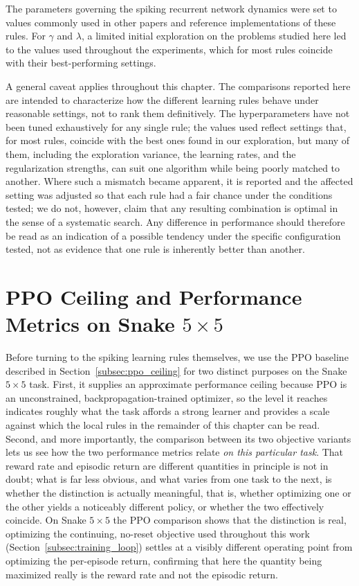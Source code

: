 The parameters governing the spiking recurrent network dynamics were set to values commonly used
in other papers and reference implementations of these rules. For
$\gamma$ and $\lambda$, a limited initial exploration on the problems studied here led to the
values used throughout the experiments, which for most rules coincide with their best-performing
settings.

A general caveat applies throughout this chapter. The comparisons reported here are
intended to characterize how the different learning rules behave under reasonable settings, not
to rank them definitively. The hyperparameters have not been tuned exhaustively for any single
rule; the values used reflect settings that, for most rules, coincide with the best ones found in
our exploration, but many of them, including the exploration variance, the learning rates, and the
regularization strengths, can suit one algorithm while being poorly matched to another. Where such
a mismatch became apparent, it is reported and the affected setting was adjusted so that each rule
had a fair chance under the conditions tested; we do not, however, claim that any resulting
combination is optimal in the sense of a systematic search. Any difference in performance should
therefore be read as an indication of a possible tendency under the specific configuration tested, not as evidence that one rule is inherently better than another.

\clearpage
\section{PPO Ceiling and Performance Metrics on Snake $5\times5$}
\label{sec:ppo_ceiling}

Before turning to the spiking learning rules themselves, we use the PPO
baseline described in Section~\ref{subsec:ppo_ceiling} for two distinct
purposes on the Snake $5\times5$ task. First, it supplies an approximate
performance ceiling because PPO is an unconstrained, backpropagation-trained
optimizer, so the level it reaches indicates roughly what the task affords a
strong learner and provides a scale against which the local rules in the
remainder of this chapter can be read. Second, and more importantly, the comparison between its two objective
variants lets us see how the two performance metrics relate \emph{on this
particular task}. That reward rate and episodic return are different
quantities in principle is not in doubt; what is far less obvious, and what
varies from one task to the next, is whether the distinction is actually
meaningful, that is, whether optimizing one or the other yields a
noticeably different policy, or whether the two effectively coincide. On
Snake $5\times5$ the PPO comparison shows that the distinction is real,
optimizing the continuing, no-reset objective used throughout this work
(Section~\ref{subsec:training_loop}) settles at a visibly different operating
point from optimizing the per-episode return, confirming that here the
quantity being maximized really is the reward rate and not the episodic
return.

